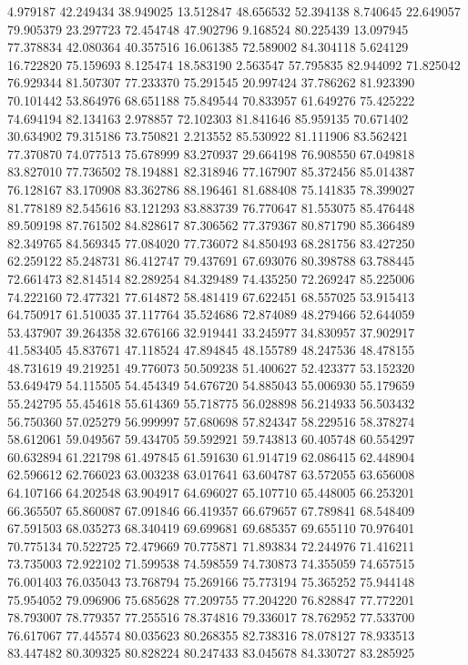 4.979187
42.249434
38.949025
13.512847
48.656532
52.394138
8.740645
22.649057
79.905379
23.297723
72.454748
47.902796
9.168524
80.225439
13.097945
77.378834
42.080364
40.357516
16.061385
72.589002
84.304118
5.624129
16.722820
75.159693
8.125474
18.583190
2.563547
57.795835
82.944092
71.825042
76.929344
81.507307
77.233370
75.291545
20.997424
37.786262
81.923390
70.101442
53.864976
68.651188
75.849544
70.833957
61.649276
75.425222
74.694194
82.134163
2.978857
72.102303
81.841646
85.959135
70.671402
30.634902
79.315186
73.750821
2.213552
85.530922
81.111906
83.562421
77.370870
74.077513
75.678999
83.270937
29.664198
76.908550
67.049818
83.827010
77.736502
78.194881
82.318946
77.167907
85.372456
85.014387
76.128167
83.170908
83.362786
88.196461
81.688408
75.141835
78.399027
81.778189
82.545616
83.121293
83.883739
76.770647
81.553075
85.476448
89.509198
87.761502
84.828617
87.306562
77.379367
80.871790
85.366489
82.349765
84.569345
77.084020
77.736072
84.850493
68.281756
83.427250
62.259122
85.248731
86.412747
79.437691
67.693076
80.398788
63.788445
72.661473
82.814514
82.289254
84.329489
74.435250
72.269247
85.225006
74.222160
72.477321
77.614872
58.481419
67.622451
68.557025
53.915413
64.750917
61.510035
37.117764
35.524686
72.874089
48.279466
52.644059
53.437907
39.264358
32.676166
32.919441
33.245977
34.830957
37.902917
41.583405
45.837671
47.118524
47.894845
48.155789
48.247536
48.478155
48.731619
49.219251
49.776073
50.509238
51.400627
52.423377
53.152320
53.649479
54.115505
54.454349
54.676720
54.885043
55.006930
55.179659
55.242795
55.454618
55.614369
55.718775
56.028898
56.214933
56.503432
56.750360
57.025279
56.999997
57.680698
57.824347
58.229516
58.378274
58.612061
59.049567
59.434705
59.592921
59.743813
60.405748
60.554297
60.632894
61.221798
61.497845
61.591630
61.914719
62.086415
62.448904
62.596612
62.766023
63.003238
63.017641
63.604787
63.572055
63.656008
64.107166
64.202548
63.904917
64.696027
65.107710
65.448005
66.253201
66.365507
65.860087
67.091846
66.419357
66.679657
67.789841
68.548409
67.591503
68.035273
68.340419
69.699681
69.685357
69.655110
70.976401
70.775134
70.522725
72.479669
70.775871
71.893834
72.244976
71.416211
73.735003
72.922102
71.599538
74.598559
74.730873
74.355059
74.657515
76.001403
76.035043
73.768794
75.269166
75.773194
75.365252
75.944148
75.954052
79.096906
75.685628
77.209755
77.204220
76.828847
77.772201
78.793007
78.779357
77.255516
78.374816
79.336017
78.762952
77.533700
76.617067
77.445574
80.035623
80.268355
82.738316
78.078127
78.933513
83.447482
80.309325
80.828224
80.247433
83.045678
84.330727
83.285925
